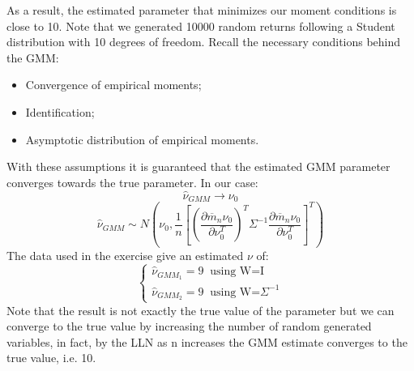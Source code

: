 \newpage
As a result, the estimated parameter that minimizes our moment conditions is close to 10. Note that we generated 10000 random returns following a Student distribution with 10 degrees of freedom. Recall the necessary conditions behind the GMM:
\begin{itemize}
    \item Convergence of empirical moments;
    \item Identification;
    \item Asymptotic distribution of empirical moments.
\end{itemize}
With these assumptions it is guaranteed that the estimated GMM parameter converges towards the true parameter. In our case:
\begin{equation*}
        \widehat{\nu}_{GMM} \to \nu_0
\end{equation*}
\begin{equation*}
        \widehat{\nu}_{GMM} \sim N(\nu_0,
        \frac{1}{n}[(\frac{\partial\overline{m}_n\nu_0}{\partial\nu_0^T})^T\Sigma^{-1}\frac{\partial\overline{m}_n\nu_0}{\partial\nu_0^T}]^T)
\end{equation*}
The data used in the exercise give an estimated $\nu$ of:
\begin{equation*}
    \begin{cases}
    \widehat{\nu}_{GMM_{1}}=9 \;\;\text{using W=I}\\
    \widehat{\nu}_{GMM_{2}}=9 \;\;\text{using W=}\Sigma^{-1}
\end{cases}
\end{equation*}
Note that the result is not exactly the true value of the parameter but we can converge to the true value by increasing the number of random generated variables, in fact, by the LLN as n increases the GMM estimate converges to the true value, i.e. 10.